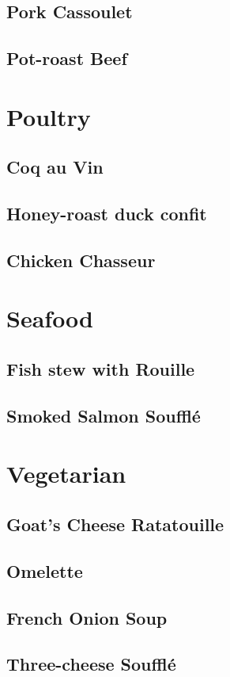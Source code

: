 \documentclass[a4paper, oneside]{book}
\begin{document}
\subsection{Pork Cassoulet}

\subsection{Pot-roast Beef}

\section{Poultry}

\subsection{Coq au Vin}

\subsection{Honey-roast duck confit}

\subsection{Chicken Chasseur}

\section{Seafood}

\subsection{Fish stew with Rouille}

\subsection{Smoked Salmon Soufflé}

\section{Vegetarian}

\subsection{Goat's Cheese Ratatouille}

\subsection{Omelette}

\subsection{French Onion Soup}

\subsection{Three-cheese Soufflé}
\end{document}
